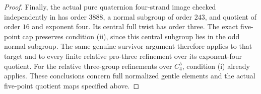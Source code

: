 \begin{proof}
Finally, the actual pure quaternion four-strand
image checked independently in
has order $3888$, a normal subgroup of order
$243$, and quotient of order $16$ and exponent
four.  Its central full twist has order three.
The exact five-point cap preserves condition
(ii), since this central subgroup lies in the
odd normal subgroup.  The same genuine-survivor
argument therefore applies to that target and
to every finite relative pro-three refinement
over its exponent-four quotient.
For the relative three-group refinements over
$C_4^5$, condition (i) already applies.
These conclusions concern full normalized
gentle elements and the actual five-point
quotient maps specified above.
\end{proof}
